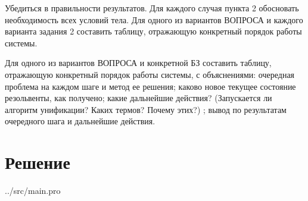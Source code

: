 Убедиться в правильности результатов.
Для каждого случая пункта 2 обосновать необходимость всех условий тела.
Для одного из вариантов ВОПРОСА и каждого варианта задания 2 составить
таблицу, отражающую конкретный порядок работы системы.

Для одного из вариантов ВОПРОСА и конкретной БЗ составить таблицу, отражающую
конкретный порядок работы системы, с объяснениями: очередная проблема на каждом шаге
и метод ее решения; каково новое текущее состояние резольвенты, как получено; какие
дальнейшие   действия?   (Запускается   ли   алгоритм   унификации?   Каких   термов?   Почему
этих?) ; вывод по результатам очередного шага и дальнейшие действия.

\section*{Решение}

\begin{lstinputlisting}[
	caption={Листинг программы},
	label={lst:t1},
	linerange={1-59},
	]{../src/main.pro}
\end{lstinputlisting}

